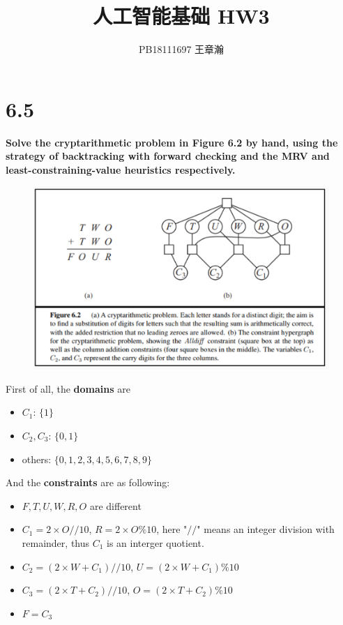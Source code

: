 \documentclass[UTF8]{article}
\title{人工智能基础 HW3}
\author{PB18111697 王章瀚}
\begin{document}
\maketitle
\section*{6.5}
\noindent \textbf{Solve the cryptarithmetic problem in Figure 6.2 by hand, using the strategy of backtracking with forward checking and the MRV and least-constraining-value heuristics respectively.}
\begin{figure}[H]
\centering
\includegraphics[width=\linewidth*2/3]{image/figure6.2.png}
\end{figure}

\noindent First of all, the \textbf{domains} are
\begin{itemize}
\item $C_1$: $\{1\}$
\item $C_2, C_3$: $\{0,1\}$
\item others: $\{0,1,2,3,4,5,6,7,8,9\}$
\end{itemize}
And the \textbf{constraints} are as following:
\begin{itemize}
\item $F, T, U, W, R, O$ are different
\item $C_1=2\times O // 10$, $R=2\times O \% 10$, here "$//$" means an integer division with remainder, thus $C_1$ is an interger quotient.
\item $C_2=(2\times W + C_1) // 10$, $U=(2\times W + C_1) \% 10$
\item $C_3=(2\times T + C_2) // 10$, $O=(2\times T + C_2) \% 10$
\item $F=C_3$
\end{itemize}
\end{document}
